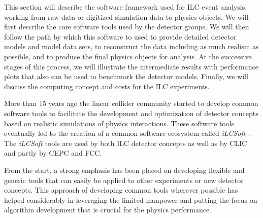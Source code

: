 %
%
\newcommand{\fix}[1]{\textcolor{red}{\texttt{#1}}} %

\newcommand{\CPP}{C\nolinebreak\hspace{-.05em}\raisebox{.4ex}{\tiny\bf
    +}\nolinebreak\hspace{-.10em}\raisebox{.4ex}{\tiny\bf +}}



This section will describe the software framework used for ILC event
analysis, working from raw data or digitized simulation data to
physics objects.   We will first describe the core software tools used
by the detector groups.  We will then follow the path by which this
software to used to provide detailed detector models and model data
sets,   to reconstruct the data including as much realism as possible,
and to produce the final physics objects for analysis.    At the
successive stages of this process, we will illustrate the intermediate results 
with  performance plots that also can be used to benchmark the
detector models.  Finally, we will discuss the computing concept and
costs for the ILC experiments. 


More than 15 years ago the linear collider community started to develop common software
tools to facilitate the development and optimization of detector concepts based on realistic
simulations of physics interactions. These software tools eventually led to the creation of
a common software ecosystem called \emph{iLCSoft}~\cite{bib:ilcsoft}.
The \emph{iLCSoft} tools are used by both ILC detector concepts as well as by CLIC
and partly by CEPC and FCC.

From the start, a strong emphasis has been placed on developing flexible and generic tools
that can easily be applied to other experiments or new detector concepts. 
This approach of developing common tools wherever possible has helped considerably in
leveraging the limited manpower and putting the focus on algorithm development that
is crucial for the physics performance. 



